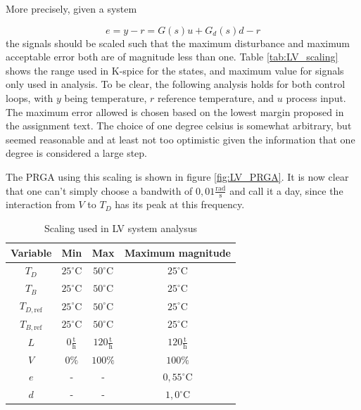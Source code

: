 \documentclass[12pt]{article}
\begin{document}
More precisely, given a system

\begin{equation}
e = y - r = G(s) u + G_d(s) d - r
\end{equation}
the signals should be scaled such that the maximum disturbance and maximum acceptable error both are of magnitude less than one. Table \ref{tab:LV_scaling} shows the range used in K-spice for the states, and maximum value for signals only used in analysis. To be clear, the following analysis holds for both control loops, with $y$ being temperature, $r$ reference temperature, and $u$ process input. The maximum error allowed is chosen based on the lowest margin proposed in the assignment text. The choice of one degree celsius is somewhat arbitrary, but seemed reasonable and at least not too optimistic given the information that one degree is considered a large step.

The PRGA using this scaling is shown in figure \ref{fig:LV_PRGA}. It is now clear that one can't simply choose a bandwith of $0,01 \frac{\textrm{rad}}{\textrm{s}}$ and call it a day, since the interaction from $V$ to $T_D$ has its peak at this frequency.



\begin{table}
\centering
\begin{tabular}{c | c | c | c}
Variable & Min & Max & Maximum magnitude \\ \hline
$T_D$ & $25^\circ$C & $50^\circ$C & $25^\circ$C \\
$T_B$ & $25^\circ$C & $50^\circ$C & $25^\circ$C \\
$T_{D, \textrm{ref}}$ & $25^\circ$C & $50^\circ$C & $25^\circ$C \\
$T_{B, \textrm{ref}}$ & $25^\circ$C & $50^\circ$C & $25^\circ$C \\
$L$ & $0 \frac{\textrm{t}}{\textrm{h}}$ & $120 \frac{\textrm{t}}{\textrm{h}}$ & $120 \frac{\textrm{t}}{\textrm{h}}$ \\
$V$ & $0\%$ & $100\%$ & $100\%$ \\
$e$ & - & - & $0,55^\circ$C \\
$d$ & - & - & $1,0^\circ$C
\end{tabular}
\caption{Scaling used in LV system analysus}
\end{table}
\end{document}
